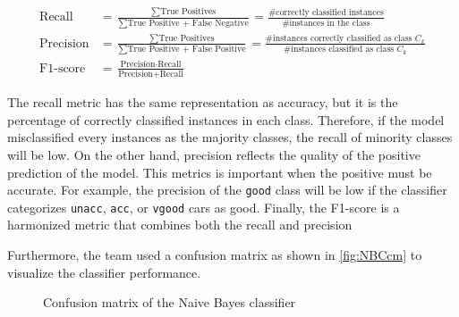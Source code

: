 \documentclass[a4paper]{article}
\begin{document}
\begin{subequations}
\begin{align}
  \text{Recall} &= \frac{\sum \text{True Positives}}{\sum \text{True Positive + False Negative}} = \frac{\text{\# correctly classified instances}}{\text{\# instances in the class}} \\
  \text{Precision} &= \frac{\sum \text{True Positives}}{\sum \text{True Positive + False Positive}} = \frac{\text{\# instances correctly classified as class } C_k}{\text{\# instances classified as class } C_k} \\
  \text{F1-score} &= \frac{\text{Precision}\cdot\text{Recall}}{\text{Precision}+\text{Recall}}
\end{align}
\end{subequations}

The recall metric has the same representation as accuracy, but it is the percentage of correctly classified instances in each class. Therefore, if the model misclassified every instances as the majority classes, the recall of minority classes will be low. On the other hand, precision reflects the quality of the positive prediction of the model. This metrics is important when the positive must be accurate. For example, the precision of the \lstinline{good} class will be low if the classifier categorizes \lstinline{unacc}, \lstinline{acc}, or \lstinline{vgood} cars as good. Finally, the F1-score is a harmonized metric that combines both the recall and precision

Furthermore, the team used a confusion matrix as shown in \autoref{fig:NBCcm} to visualize the classifier performance.

\begin{figure} [h]
  \caption{Confusion matrix of the Naive Bayes classifier} 
  \label{fig:NBCcm}
\end{figure}
\end{document}
